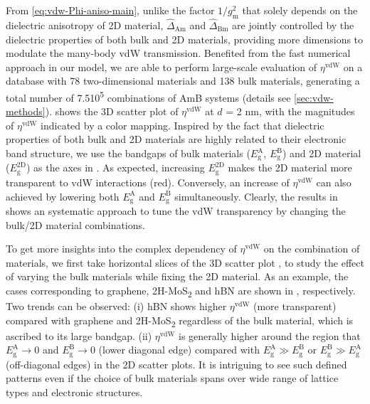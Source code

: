From \autoref{eq:vdw-Phi-aniso-main}, unlike the factor
\(1/g_{\mathrm{m}}^{2}\) that solely depends on the dielectric
anisotropy of 2D material, \(\hat{\Delta}_{\mathrm{Am}}\) and
\(\hat{\Delta}_{\mathrm{Bm}}\) are jointly controlled by the
dielectric properties of both bulk and 2D materials, providing more
dimensions to modulate the many-body vdW transmission.
%
Benefited from
the fast numerical approach in our model, we are able to perform
large-scale evaluation of $\eta^{\mathrm{vdW}}$ on a database with
78 two-dimensional materials and 138 bulk materials, generating a total number of
7.5\texttimes{}10\textsuperscript{5} combinations of AmB systems
(details see \autoref{sec:vdw-methods}).
%
 shows the 3D scatter plot of
\(\eta^{\mathrm{vdW}}\) at \(d\) = 2 nm, with the magnitudes of
$\eta^{\mathrm{vdW}}$ indicated by a color mapping. Inspired by the
fact that dielectric properties of both bulk \cite{Moss_1950} and 2D
materials  are highly related to their
electronic band structure, we use the bandgaps of bulk materials
(\(E_{\mathrm{g}}^{\mathrm{A}}\), \(E_{\mathrm{g}}^{\mathrm{B}}\)) and
2D material (\(E_{\mathrm{g}}^{\mathrm{2D}}\)) as the axes in
 .
%
As expected, increasing
\(E_{\mathrm{g}}^{\mathrm{2D}}\) makes the 2D material more
transparent to vdW interactions (red).
%
Conversely, an increase of \(\eta^{\mathrm{vdW}}\) can also achieved
by lowering both \(E_{\mathrm{g}}^{\mathrm{A}}\) and
\(E_{\mathrm{g}}^{\mathrm{B}}\) simultaneously.
%
Clearly, the results in  shows an systematic
approach to tune the vdW transparency by changing the bulk/2D material
combinations.


To get more insights into the complex dependency of
\(\eta^{\mathrm{vdW}}\) on the combination of materials, we first take
horizontal slices of the 3D scatter plot , to
study the effect of varying the bulk materials while fixing the 2D
material.
%
As an example, the cases corresponding to graphene,
2H-MoS\textsubscript{2} and hBN are shown in , respectively.
%
Two trends can be observed: (i) hBN shows higher $\eta^{\mathrm{vdW}}$
(more transparent) compared with graphene and 2H-MoS\textsubscript{2}
regardless of the bulk material, which is ascribed to its large
bandgap. (ii) $\eta^{\mathrm{vdW}}$ is generally higher around the
region that \(E_{\mathrm{g}}^{\mathrm{A}} \to 0\) and
\(E_{\mathrm{g}}^{\mathrm{B}} \to 0\) (lower diagonal edge) compared
with \(E_{\mathrm{g}}^{\mathrm{A}} \gg E_{\mathrm{g}}^{\mathrm{B}}\)
or \(E_{\mathrm{g}}^{\mathrm{B}} \gg E_{\mathrm{g}}^{\mathrm{A}}\)
(off-diagonal edges) in the 2D scatter plots.
%
It is intriguing to see such defined patterns even
if the choice of bulk materials spans over wide range of lattice types
and electronic structures.


